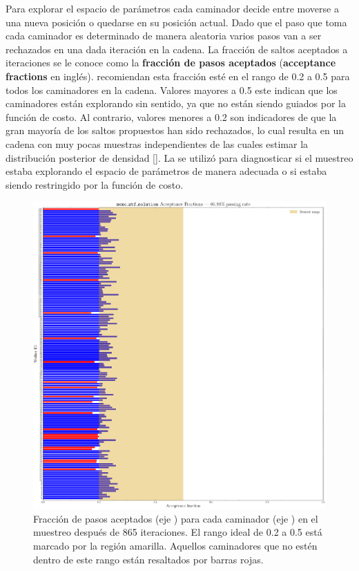 Para explorar el espacio de parámetros cada caminador decide entre moverse a una
nueva posición o quedarse en su posición actual. Dado que el paso que toma cada
caminador es determinado de manera aleatoria varios pasos van a ser rechazados
en una dada iteración en la cadena. La fracción de saltos aceptados a
iteraciones se le conoce como la \textbf{fracción de pasos aceptados}
(\textbf{acceptance fractions} en inglés).
recomiendan esta fracción esté en el rango de 0.2 a 0.5 para todos los
caminadores en la cadena. Valores mayores a 0.5 este indican que los caminadores
están explorando sin sentido, ya que no están siendo guiados por la función de
costo. Al contrario, valores menores a 0.2 son indicadores de que la gran
mayoría de los saltos propuestos han sido rechazados, lo cual resulta en un
cadena con muy pocas muestras independientes de las cuales estimar la
distribución posterior de densidad [].
La  se utilizó para diagnosticar si el
muestreo estaba explorando el espacio de parámetros de manera adecuada o si
estaba siendo restringido por la función de costo.

\begin{figure}[!ht]
	\centering
	\includegraphics[scale=0.36]{Metodologia/Secciones/ModeloComputacional/Figures/Figura MCMC ZTF Acceptance Fractions.png}
	\caption{Fracción de pasos aceptados (eje ) para cada caminador (eje
	) en el muestreo después de 865 iteraciones. El rango ideal de 0.2 a
	0.5 está marcado por la región amarilla. Aquellos caminadores que no estén
	dentro de este rango están resaltados por barras rojas.}
	\label{figuraFraccionPasosAceptados}
\end{figure}

